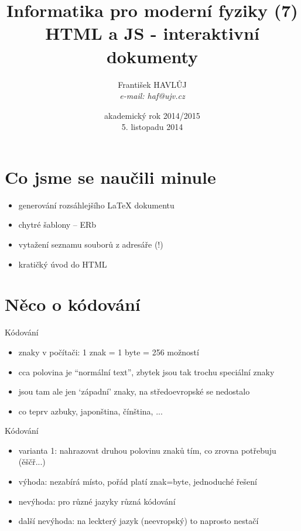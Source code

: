 \documentclass{beamer}
\title[IMF (7)]{Informatika pro moderní fyziky (7)\\ HTML a JS - interaktivní dokumenty}
\author[Franti\v{s}ek HAVL\r{U}J, ORF ÚJV Řež]{Franti\v{s}ek HAVL\r{U}J\\{\scriptsize \emph{e-mail: haf@ujv.cz}}}
\date{akademický rok 2014/2015\\5. listopadu 2014}
\institute[ORF ÚJV Řež]
{ÚJV Řež\\oddělení Reaktorové fyziky a podpory palivového cyklu}
\begin{document}
\begin{frame}
  \titlepage
\end{frame}

\begin{frame}
  \tableofcontents
\end{frame}

\section{Co jsme se naučili minule}

\begin{frame}{}
  \begin{itemize}
    \item generování rozsáhlejšího LaTeX dokumentu
    \item chytré šablony -- ERb
    \item vytažení seznamu souborů z adresáře (!)
    \item kratičký úvod do HTML
  \end{itemize}
\end{frame}

\section{Něco o kódování}

\begin{frame}{Kódování}
  \begin{itemize}
    \item znaky v počítači: 1 znak = 1 byte = 256 možností
    \item cca polovina je ``normální text'', zbytek jsou tak trochu speciální znaky
    \item jsou tam ale jen `západní' znaky, na středoevropské se nedostalo
    \item co teprv azbuky, japonština, čínština, ...
  \end{itemize}
\end{frame}

\begin{frame}{Kódování}
  \begin{itemize}
    \item varianta 1: nahrazovat druhou polovinu znaků tím, co zrovna potřebuju (ěščř...)
    \item výhoda: nezabírá místo, pořád platí znak=byte, jednoduché řešení
    \item nevýhoda: pro různé jazyky různá kódování
    \item další nevýhoda: na leckterý jazyk (neevropský) to naprosto nestačí
  \end{itemize}
\end{frame}
\end{document}
